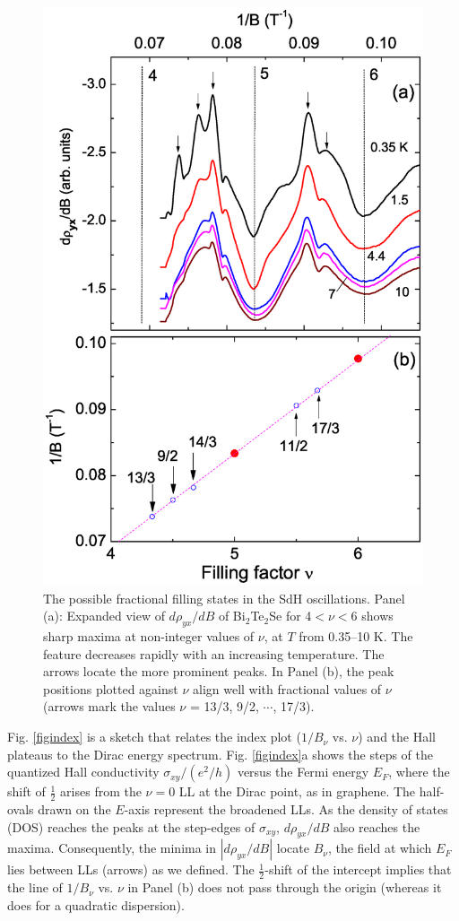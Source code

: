 \begin{figure}[!htbp]
  \begin{center}            
\includegraphics[width=0.9\linewidth]{ch-bts/figures/FigrhoxyExpand.eps} 
\caption{\label{figexpand} 
The possible fractional filling states in the SdH oscillations.
Panel (a): Expanded view of $d\rho_{yx}/dB$ of Bi$_2$Te$_2$Se for 4$<\nu<$6 shows sharp
maxima at non-integer values of $\nu$, at $T$ from 0.35--10 K. The feature decreases rapidly with an increasing temperature. The arrows
locate the more prominent peaks.  In Panel (b), the peak positions plotted
against $\nu$ align well with fractional values of $\nu$ (arrows mark the values
$\nu$ = 13/3, 9/2, $\cdots$, 17/3). 
}
  \end{center}
\end{figure}


Fig. \ref{figindex} is a sketch that relates the index plot ($1/B_{\nu}$ vs. $\nu$) and the Hall plateaus to the Dirac energy spectrum.  
Fig. \ref{figindex}a shows the steps of the quantized Hall conductivity $\sigma_{xy}/(e^2/h)$ versus the Fermi energy $E_F$,  where the shift of $\frac12$ arises from the $\nu = 0$ LL at the Dirac point, as in graphene. The half-ovals drawn on the $E$-axis represent the broadened LLs.  As the density of states (DOS) reaches the peaks at the step-edges of $\sigma_{xy}$, $d\rho_{yx}/dB$ also reaches the maxima. Consequently, the minima in $|d\rho_{yx}/dB|$ locate $B_{\nu}$, the field at which $E_F$ lies between LLs (arrows) as we defined. The $\frac12$-shift of the intercept implies that the line of $1/B_{\nu}$ vs. $\nu$ in Panel (b) does not pass through the origin (whereas it does for a quadratic dispersion).


